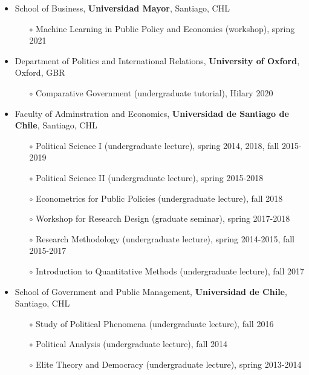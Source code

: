 \begin{publications}

\begin{itemize}
\item{\small School of Business, {\bfseries Universidad Mayor}, Santiago, CHL}
\begin{itemize}
\item[$\circ$]{\small Machine Learning in Public Policy and Economics (workshop), spring 2021}
\end{itemize}
\item{\small Department of Politics and International Relations, {\bfseries University of Oxford}, Oxford, GBR}
\begin{itemize}
\item[$\circ$]{\small Comparative Government (undergraduate tutorial), Hilary 2020}
\end{itemize}
\item{\small Faculty of Adminstration and Economics, {\bfseries Universidad de Santiago de Chile}, Santiago, CHL}
\begin{itemize}
\item[$\circ$]{\small Political Science I (undergraduate lecture), spring 2014, 2018, fall 2015-2019}
\item[$\circ$]{\small Political Science II (undergraduate lecture), spring 2015-2018}
\item[$\circ$]{\small Econometrics for Public Policies (undergraduate lecture), fall 2018}
\item[$\circ$]{\small Workshop for Research Design (graduate seminar), spring 2017-2018}
\item[$\circ$]{\small Research Methodology (undergraduate lecture), spring 2014-2015, fall 2015-2017}
\item[$\circ$]{\small Introduction to Quantitative Methods (undergraduate lecture), fall 2017}
\end{itemize}
\item{\small School of Government and Public Management, {\bfseries Universidad de Chile}, Santiago, CHL}
\begin{itemize}
\item[$\circ$]{\small Study of Political Phenomena (undergraduate lecture), fall 2016}
\item[$\circ$]{\small Political Analysis (undergraduate lecture), fall 2014}
\item[$\circ$]{\small Elite Theory and Democracy (undergraduate lecture), spring 2013-2014}
\end{itemize}
\end{itemize}

\vspace{1mm}
\end{publications}
\pagebreak